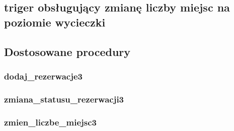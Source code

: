 \documentclass[12pt]{article}
\begin{document}
\subsection{triger obsługujący zmianę liczby miejsc na poziomie wycieczki}


\subsection{Dostosowane procedury}

\subsubsection{dodaj\_rezerwacje3}


\subsubsection{zmiana\_statusu\_rezerwacji3}


\subsubsection{zmien\_liczbe\_miejsc3}

\end{document}
